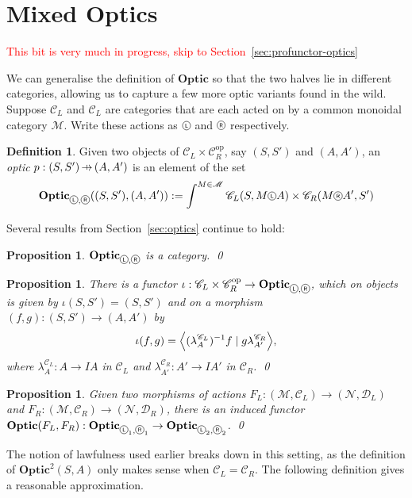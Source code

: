 \documentclass[11pt,letterpaper]{article}
\theoremstyle{plain}
\newtheorem{proposition}[theorem]{Proposition}
\theoremstyle{definition}
\newtheorem{definition}[theorem]{Definition}
\newcommand{\C}{\mathscr{C}}
\newcommand{\D}{\mathscr{D}}
\newcommand{\M}{\mathscr{M}}
\newcommand{\N}{\mathscr{N}}
\newcommand{\Optic}{\mathbf{Optic}}
\newcommand{\Twoptic}{\mathbf{Optic}^2}
\newcommand{\op}{\mathrm{op}}
\newcommand*\circled[1]{\tikz[baseline={([yshift=-0.65ex]current bounding box.center)}]{
   \node[shape=circle,draw,inner sep=1pt] (char) {#1};}}
\newcommand{\actL}{{\circled{\tiny$\mathsf{L}$}}}
\newcommand{\actR}{{\circled{\tiny$\mathsf{R}$}}}
\newcommand{\rep}[2]{{\ensuremath \left\langle #1 \mid #2 \right\rangle}}
\newcommand{\hto}{\ensuremath{\,\mathaccent\shortmid\rightarrow\,}}
\newcommand{\todo}[1]{\textcolor{red}{\small #1}}
\begin{document}
\section{Mixed Optics}\label{sec:mixed-optics}

\todo{This bit is very much in progress, skip to Section~\ref{sec:profunctor-optics}}

We can generalise the definition of $\Optic$ so that the two halves lie in different categories, allowing us to capture a few more optic variants found in the wild. Suppose $\C_L$ and $\C_L$ are categories that are each acted on by a common monoidal category $\M$. Write these actions as $\actL$ and $\actR$ respectively.

\begin{definition}
  Given two objects of $\C_L \times \C_R^\op$, say $(S, S')$ and $(A, A')$, an \emph{optic} $p : (S, S') \hto (A, A')$ is an element of the set
  \begin{align*}
    \Optic_{\actL, \actR}((S, S'), (A, A')) := \int^{M \in \M} \C_L(S, M \actL A) \times \C_R(M \actR A', S')
  \end{align*}
\end{definition}

Several results from Section~\ref{sec:optics} continue to hold:
\begin{proposition}\label{prop:mixed-optic-is-cat}
  $\Optic_{\actL, \actR}$ is a category. \qed
\end{proposition}
\begin{proposition}
  There is a functor $\iota : \C_L \times \C_R^\op \to \Optic_{\actL, \actR}$, which on objects is given by $\iota(S, S') = (S, S')$ and on a morphism $(f, g) : (S, S') \to (A, A')$ by \[\iota(f, g) = \rep{(\lambda^{\C_L}_A)^{-1} f}{g \lambda^{\C_R}_{A'}},\] where $\lambda^{\C_L}_A : A \to IA$ in $\C_L$ and $\lambda^{\C_R}_{A'} : A' \to IA'$ in $\C_R$. \qed
\end{proposition}
\begin{proposition}\label{prop:mixed-change-of-action}
  Given two morphisms of actions $F_L : (\M, \C_L) \to (\N, \D_L)$ and $F_R : (\M, \C_R) \to (\N, \D_R)$, there is an induced functor $\Optic(F_L, F_R) : \Optic_{\actL_1, \actR_1} \to \Optic_{\actL_2, \actR_2}$. \qed
\end{proposition}

The notion of lawfulness used earlier breaks down in this setting, as the definition of $\Twoptic(S, A)$ only makes sense when $\C_L = \C_R$. The following definition gives a reasonable approximation.
\end{document}
